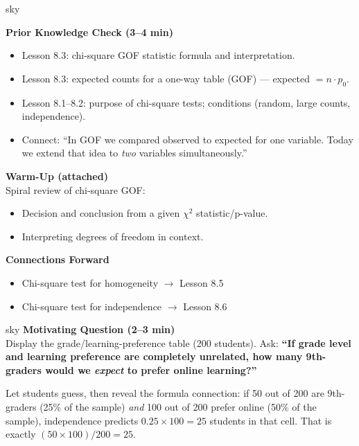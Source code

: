 \documentclass[10pt]{article}
\begin{document}
\begin{skillbox}{sky}
\begin{minipage}[t]{0.48\linewidth}
    \textbf{Prior Knowledge Check (3--4 min)}
    \begin{itemize}
        \item Lesson 8.3: chi-square GOF statistic formula and interpretation.
        \item Lesson 8.3: expected counts for a one-way table (GOF) --- expected $= n \cdot p_0$.
        \item Lesson 8.1--8.2: purpose of chi-square tests; conditions (random, large counts,
              independence).
        \item Connect: ``In GOF we compared observed to expected for one variable. Today
              we extend that idea to \emph{two} variables simultaneously.''
    \end{itemize}
\end{minipage}
\hfill
\begin{minipage}[t]{0.48\linewidth}
    \textbf{Warm-Up (attached)}\\
    Spiral review of chi-square GOF:
    \begin{itemize}
        \item Decision and conclusion from a given $\chi^2$ statistic/p-value.
        \item Interpreting degrees of freedom in context.
    \end{itemize}
    \textbf{Connections Forward}
    \begin{itemize}
        \item Chi-square test for homogeneity $\to$ Lesson 8.5
        \item Chi-square test for independence $\to$ Lesson 8.6
    \end{itemize}
\end{minipage}
\end{skillbox}

\begin{skillbox}[Hook]{sky}
\textbf{Motivating Question (2--3 min)}\\
Display the grade/learning-preference table (200 students). Ask:
\textbf{``If grade level and learning preference are completely unrelated, how many
9th-graders would we \emph{expect} to prefer online learning?''}

Let students guess, then reveal the formula connection: if 50 out of 200 are 9th-graders
(25\% of the sample) \emph{and} 100 out of 200 prefer online (50\% of the sample),
independence predicts $0.25 \times 100 = 25$ students in that cell.
That is exactly $(50 \times 100)/200 = 25$.
\end{skillbox}
\end{document}
